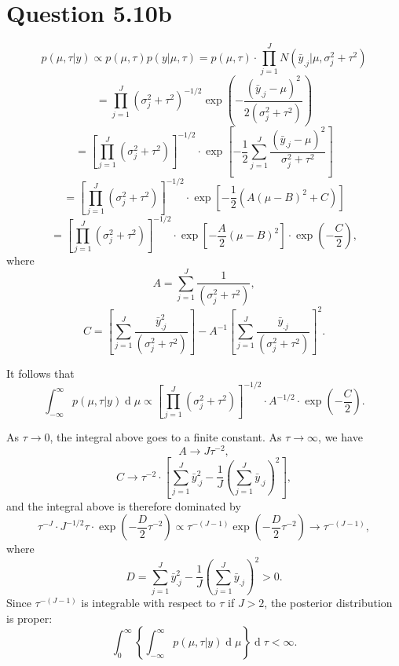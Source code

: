 \documentclass{article}
\DeclareMathOperator*{\deriv}{d}
\begin{document}
\section*{Question 5.10b}
{
    $$p(\mu, \tau | y) \propto p(\mu, \tau) p(y | \mu, \tau) = p(\mu, \tau) \cdot \prod_{j=1}^{J} {N(\bar{y}_{.j} | \mu, \sigma_j^2 + \tau^2)}$$
    $$= \prod_{j=1}^{J} {(\sigma_j^2 + \tau^2)^{-1/2} \exp{ \left( - \frac{(\bar{y}_{.j} - \mu)^2}{2(\sigma_j^2 + \tau^2)} \right) }}$$
    $$= \left[ \prod_{j=1}^{J} {(\sigma_j^2 + \tau^2)} \right]^{-1/2} \cdot \exp{\left[ -\frac{1}{2} \sum_{j=1}^{J} {\frac{(\bar{y}_{.j} - \mu)^2}{\sigma_j^2 + \tau^2}} \right]}$$
    $$= \left[ \prod_{j=1}^{J} {(\sigma_j^2 + \tau^2)} \right]^{-1/2} \cdot \exp{\left[ -\frac{1}{2} {\left( A(\mu-B)^2 + C \right)} \right]}$$
    $$= \left[ \prod_{j=1}^{J} {(\sigma_j^2 + \tau^2)} \right]^{-1/2} \cdot \exp{\left[ -\frac{A}{2} (\mu-B)^2 \right]} \cdot \exp{(-\frac{C}{2})},$$
    where $$A = \sum_{j=1}^{J} {\frac{1}{(\sigma_j^2 + \tau^2)}},$$
    $$C = \left[ \sum_{j=1}^{J} {\frac{\bar{y}_{.j}^2}{(\sigma_j^2 + \tau^2)}} \right] - A^{-1} \left[ \sum_{j=1}^{J} {\frac{\bar{y}_{.j}}{(\sigma_j^2 + \tau^2)}} \right]^2 .$$

    It follows that 
    $$\int_{-\infty}^{\infty} {p(\mu, \tau | y) \deriv{\mu}} \propto \left[ \prod_{j=1}^{J} {(\sigma_j^2 + \tau^2)} \right]^{-1/2} \cdot A^{-1/2} \cdot \exp{(-\frac{C}{2})}.$$

    As $\tau \rightarrow 0$, the integral above goes to a finite constant. As $\tau \rightarrow \infty$, we have
    $$A \rightarrow J \tau^{-2},$$
    $$C \rightarrow \tau^{-2} \cdot \left[ \sum_{j=1}^{J}{\bar{y}_{.j}^2} - \frac{1}{J} (\sum_{j=1}^{J}{\bar{y}_{.j}})^2 \right],$$
    and the integral above is therefore dominated by
    $$\tau^{-J} \cdot J^{-1/2} \tau \cdot \exp{\left(-\frac{D}{2} \tau^{-2}\right)} \propto \tau^{-(J-1)} \exp{\left(-\frac{D}{2} \tau^{-2}\right)} \rightarrow \tau^{-(J-1)},$$ 
    where $$D = \sum_{j=1}^{J}{\bar{y}_{.j}^2} - \frac{1}{J} (\sum_{j=1}^{J}{\bar{y}_{.j}})^2 > 0.$$
    Since $\tau^{-(J-1)}$ is integrable with respect to $\tau$ if $J > 2$, the posterior distribution is proper:
    $$\int_{0}^{\infty} { \left\{ \int_{-\infty}^{\infty} {p(\mu, \tau | y) \deriv{\mu}} \right\} \deriv{\tau}} < \infty.$$
}
\end{document}
